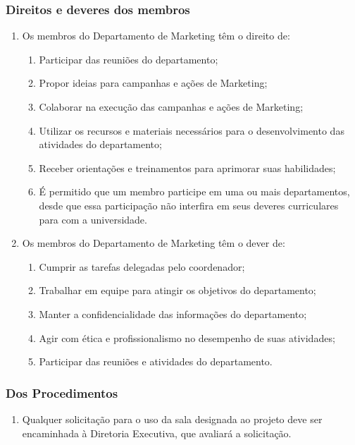         \subsubsection{Direitos e deveres dos membros}
        \begin{enumerate}
            \item Os membros do Departamento de Marketing têm o direito de:
            \begin{enumerate}
                \item Participar das reuniões do departamento;
                \item Propor ideias para campanhas e ações de Marketing;
                \item Colaborar na execução das campanhas e ações de Marketing;
                \item Utilizar os recursos e materiais necessários para o desenvolvimento das atividades do departamento;
                \item Receber orientações e treinamentos para aprimorar suas habilidades;
                \item É permitido que um membro participe em uma ou mais departamentos, desde que essa participação não interfira em seus deveres curriculares para com a universidade.
            \end{enumerate} 
            \item  Os membros do Departamento de Marketing têm o dever de:
            \begin{enumerate}
                \item Cumprir as tarefas delegadas pelo coordenador;
                \item Trabalhar em equipe para atingir os objetivos do departamento;
                \item Manter a confidencialidade das informações do departamento;
                \item Agir com ética e profissionalismo no desempenho de suas atividades;
                \item Participar das reuniões e atividades do departamento.
            \end{enumerate}
        \end{enumerate}
        \subsubsection{Dos Procedimentos}
            \begin{enumerate}
                \item Qualquer solicitação para o uso da sala designada ao projeto deve ser encaminhada à Diretoria Executiva, que avaliará a solicitação.
            \end{enumerate}
        
